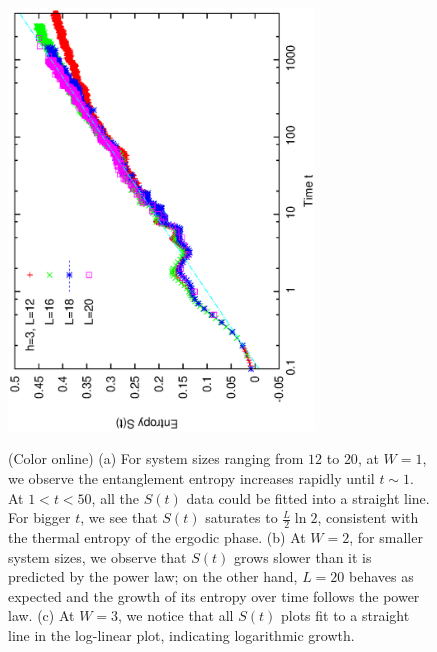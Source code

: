 \documentclass[prl,aps,epsf,showpacs,twocolumn,letterpaper]{revtex4}
\begin{document}
\begin{figure}[b]
  \includegraphics[angle=-90,width=3.2in]{newfig1e.ps}\\
  \vspace{0.12in}
  \caption{(Color online) (a) 
    For system sizes ranging from $12$ to $20$, at $W=1$, we observe the
    entanglement entropy increases rapidly until $t \sim 1$.
    At $1<t<50$, all the $S(t)$ data could be fitted into a straight line.
    For bigger $t$, we see that $S(t)$ saturates to $\frac{L}{2} \ln{2}$,
    consistent with the thermal entropy of the ergodic phase.
    (b) At $W=2$, for smaller system sizes, we observe that $S(t)$ grows slower
    than it is predicted by the power law; on the other hand, $L=20$ behaves as
    expected and the growth of its entropy over time follows the power law.
    (c) At $W=3$, we notice that all $S(t)$ plots fit to a straight line in the
    log-linear plot, indicating logarithmic growth.
  }
\label{fig3}
\end{figure}
\end{document}
